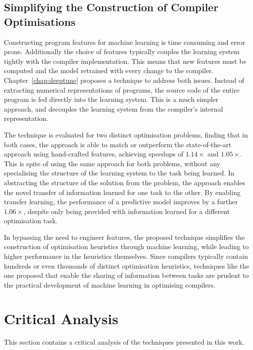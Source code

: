\subsection{Simplifying the Construction of Compiler Optimisations}

Constructing program features for machine learning is time consuming and error prone. Additionally the choice of features typically couples the learning system tightly with the compiler implementation. This means that new features must be computed and the model retrained with every change to the compiler. Chapter~\ref{chap:deeptune} proposes a technique to address both issues. Instead of extracting numerical representations of programs, the source code of the entire program is fed directly into the learning system. This is a much simpler approach, and decouples the learning system from the compiler's internal representation.

The technique is evaluated for two distinct optimisation problems, finding that in both cases, the approach is able to match or outperform the state-of-the-art approach using hand-crafted features, achieving speedups of $1.14\times$ and $1.05\times$. This is spite of using the same approach for both problems, without any specialising the structure of the learning system to the task being learned. In abstracting the structure of the solution from the problem, the approach enables the novel transfer of information learned for one task to the other. By enabling transfer learning, the performance of a predictive model improves by a further $1.06\times$, despite only being provided with information learned for a different optimisation task.

In bypassing the need to engineer features, the proposed technique simplifies the construction of optimisation heuristics through machine learning, while leading to higher performance in the heuristics themselves. Since compilers typically contain hundreds or even thousands of distinct optimisation heuristics, techniques like the one proposed that enable the sharing of information between tasks are prudent to the practical development of machine learning in optimising compilers.


\section{Critical Analysis}
\label{sec:conclusions-critical-analysis}

This section contains a critical analysis of the techniques presented in this work.


